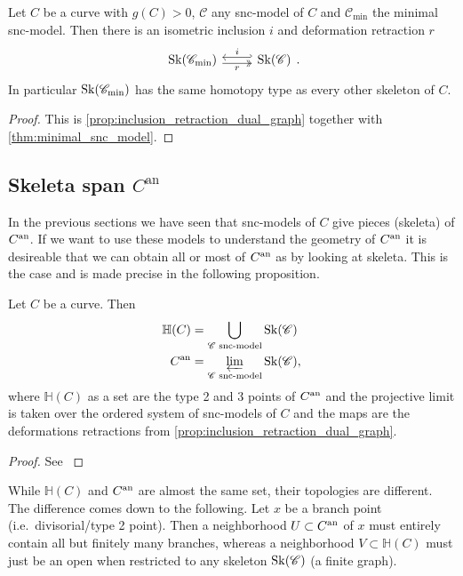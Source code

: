 \begin{corollary}
	Let $C$ be a curve with  $g(C) > 0$, $\mathscr C$ any snc-model of $C$ and $\mathscr C_\text{min} $ the minimal snc-model. 
	Then there is an isometric inclusion $i$ and deformation retraction $r$
\[
\begin{tikzcd}
	\sk(\mathscr C_\text{min} ) \rar[hookleftarrow, shift left]{i} \rar[twoheadrightarrow, shift right, ']{r} & \sk(\mathscr C) 
\end{tikzcd}
.\] 
In particular $\operatorname{Sk}(\mathscr C_\text{min} )$ has the same homotopy type as every other skeleton of $C$. 
\end{corollary}
\begin{proof}
	This is \cref{prop:inclusion_retraction_dual_graph} together with \cref{thm:minimal_snc_model}.
\end{proof}

\subsection{Skeleta span $C^{\mathrm{an}}$} \label{sec:skeleta_span_C_an}

In the previous sections we have seen that snc-models of $C$ give pieces (skeleta) of $C{}^{\text{an}}$. 
If we want to use these models to understand the geometry of $C{}^{\text{an}}$ it is desireable that we can obtain all or most of $C{}^{\text{an}}$ as by looking at skeleta. 
This is the case and is made precise in the following proposition. 
\begin{proposition}\label{prop:skeleta_curve_limits}
	Let $C$ be a curve. Then 
	\begin{align*}
		\mathbb H(C) &= \bigcup_{\mathscr C \text{ snc-model}} \operatorname{Sk}(\mathscr C) \\
		C{}^{\text{an}} &= \varprojlim_{\mathscr C \text{ snc-model}} \operatorname{Sk}(\mathscr C)
	,\end{align*}
	where $\mathbb{H}(C)$ as a set are the type 2 and 3 points of $C{}^{\text{an}}$ and the projective limit is taken over the ordered system of snc-models of $C$ and the maps are the deformations retractions from \cref{prop:inclusion_retraction_dual_graph}.
\end{proposition}
\begin{proof}
	See \cite[§2.2.2 and  lem.\ 2.3.2]{bakerWeightFunctionsBerkovich2016}
\end{proof}
\begin{remark}
	While $\mathbb{H}(C)$ and $C{}^{\text{an}}$ are almost the same set, their topologies are different. 
	The difference comes down to the following. 
	Let $x$ be a branch point (i.e.\ divisorial/type 2 point).
	Then a neighborhood $U \subset C{}^{\text{an}}$ of $x$ must entirely contain all but finitely many branches, whereas a neighborhood $V \subset \mathbb{H}(C)$ must just be an open when restricted to any skeleton $\operatorname{Sk}(\mathscr C)$ (a finite graph). 
\end{remark}

